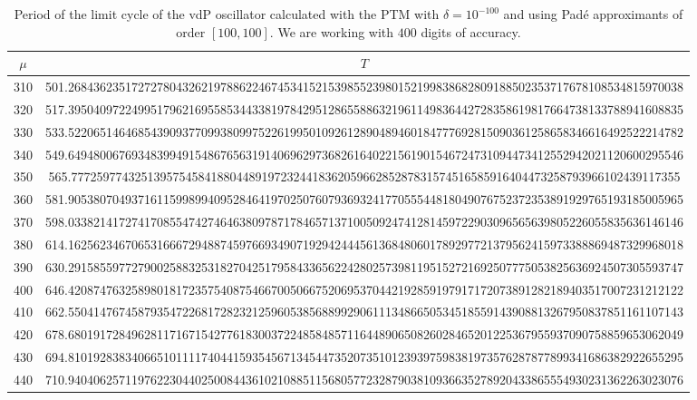 \documentclass[final]{article}
\begin{document}
\begin{table}
	\caption{Period of the limit cycle of the vdP oscillator calculated with the PTM with $\delta=10^{-100}$ and using Pad\'e approximants of order $[100,100]$. We are working with $400$ digits of accuracy. }
	\bigskip
	\label{table_T_vdP3}
	\begin{center}
		\begin{tabular}{|c|c|}
			\hline
			$\mu$ &   $T$    \\
			\hline
			310 & 501.2684362351727278043262197886224674534152153985523980152199838682809188502353717678108534815970038 \\
			320 &  517.3950409722499517962169558534433819784295128655886321961149836442728358619817664738133788941608835 \\
			330 &  533.5220651464685439093770993809975226199501092612890489460184777692815090361258658346616492522214782 \\
			340 &  549.6494800676934839949154867656319140696297368261640221561901546724731094473412552942021120600295546 \\
			350 &  565.777259774325139575458418804489197232441836205966285287831574516585916404473258793966102439117355 \\
			360 &  581.9053807049371611599899409528464197025076079369324177055544818049076752372353891929765193185005965 \\
			370 &  598.0338214172741708554742746463809787178465713710050924741281459722903096565639805226055835636146146 \\
			380 &  614.1625623467065316667294887459766934907192942444561368480601789297721379562415973388869487329968018 \\
			390 &  630.2915855977279002588325318270425179584336562242802573981195152721692507775053825636924507305593747 \\
			400 &  646.4208747632589801817235754087546670050667520695370442192859197917172073891282189403517007231212122 \\
			410 &  662.5504147674587935472268172823212596053856889929061113486650534518559143908813267950837851161107143 \\
			420 &  678.6801917284962811716715427761830037224858485711644890650826028465201225367955937090758859653062049 \\
			430 &  694.8101928383406651011117404415935456713454473520735101239397598381973576287877899341686382922655295 \\
			440 &  710.9404062571197622304402500844361021088511568057723287903810936635278920433865554930231362263023076 \\

\end{tabular}
\end{center}
\end{table}
\end{document}
